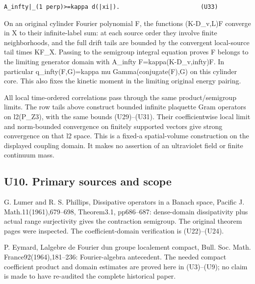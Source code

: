 \documentclass[11pt,a4paper]{article}
\renewcommand{\[}{\begingroup\small\originaldisplaystart}
\renewcommand{\]}{\originaldisplayend\endgroup}
\begin{document}
\begin{verbatim}
A_infty|_(1 perp)>=kappa d(|xi|).                       (U33)
\end{verbatim}

On an original cylinder Fourier polynomial F, the functions (K-D\_v,L)F
converge in X to their infinite-label sum: at each source order they
involve finite neighborhoods, and the full drift tails are bounded by
the convergent local-source tail times
\textbar\textbar KF\textbar\textbar\_X. Passing to the semigroup
integral equation proves F belongs to the limiting generator domain with
A\_infty
{F\allowbreak{}=\allowbreak{}k\allowbreak{}a\allowbreak{}p\allowbreak{}p\allowbreak{}a\allowbreak{}(\allowbreak{}K\allowbreak{}-\allowbreak{}D\allowbreak{}\_\allowbreak{}v\allowbreak{},\allowbreak{}i\allowbreak{}n\allowbreak{}f\allowbreak{}t\allowbreak{}y\allowbreak{})\allowbreak{}F\allowbreak{}.\allowbreak{}}
In particular
{q\allowbreak{}\_\allowbreak{}i\allowbreak{}n\allowbreak{}f\allowbreak{}t\allowbreak{}y\allowbreak{}(\allowbreak{}F\allowbreak{},\allowbreak{}G\allowbreak{})\allowbreak{}=\allowbreak{}k\allowbreak{}a\allowbreak{}p\allowbreak{}p\allowbreak{}a\allowbreak{}}
mu Gamma(conjugate(F),G) on this cylinder core. This also fixes the
kinetic moment in the limiting original energy pairing.

All local time-ordered correlations pass through the same
product/semigroup limits. The row tails above construct bounded infinite
plaquette Gram operators on l2(P\_Z3), with the same bounds
(U29)--(U31). Their coefficientwise local limit and norm-bounded
convergence on finitely supported vectors give strong convergence on
that l2 space. This is a fixed-a spatial-volume construction on the
displayed coupling domain. It makes no assertion of an ultraviolet field
or finite continuum mass.

\subsection{U10. Primary sources and
scope}\label{u10.-primary-sources-and-scope}

G. Lumer and R. S. Phillips, Dissipative operators in a Banach space,
Pacific J. Math.11(1961),679--698, Theorem3.1, pp686--687: dense-domain
dissipativity plus actual range surjectivity gives the contraction
semigroup. The original theorem pages were inspected. The
coefficient-domain verification is (U22)--(U24).

P. Eymard, L\textquotesingle algebre de Fourier d\textquotesingle un
groupe localement compact, Bull. Soc. Math. France92(1964),181--236:
Fourier-algebra antecedent. The needed compact coefficient product and
domain estimates are proved here in (U3)--(U9); no claim is made to have
re-audited the complete historical paper.
\end{document}
